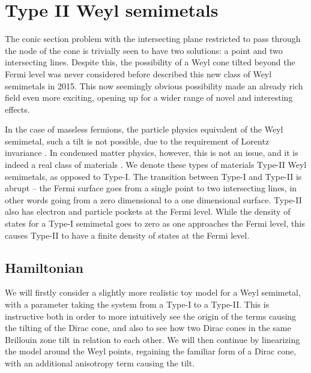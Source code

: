 \section{Type II Weyl semimetals}
\label{sec:typeii}

The conic section problem with the intersecting plane restricted to pass through the node of the cone is trivially seen to have two solutions: a point and two intersecting lines.
Despite this, the possibility of a Weyl cone tilted beyond the Fermi level was never considered before \citeauthor{soluyanovTypeIIWeylSemimetals2015} described this new class of Weyl semimetals in 2015.
This now seemingly obvious possibility made an already rich field even more exciting, opening up for a wider range of novel and interesting effects.

In the case of massless fermions, the particle physics equivalent of the Weyl semimetal, such a tilt is not possible, due to the requirement of Lorentz invariance .
In condensed matter physics, however, this is not an issue, and it is indeed a real class of materials .
We denote these types of materials Type-II Weyl semimetals, as opposed to Type-I.
The transition between Type-I and Type-II is abrupt -- the Fermi surface goes from a single point to two intersecting lines, in other words going from a zero dimensional to a one dimensional surface.
Type-II also has electron and particle pockets at the Fermi level.
While the density of states for a Type-I semimetal goes to zero as one approaches the Fermi level, this causes Type-II to have a finite density of states at the Fermi level.

\subsection{Hamiltonian}
We will firstly consider a slightly more realistic toy model for a Weyl semimetal, with a parameter taking the system from a Type-I to a Type-II.
This is instructive both in order to more intuitively see the origin of the terms causing the tilting of the Dirac cone, and also to see how two Dirac cones in the same Brillouin zone tilt in relation to each other.
We will then continue by linearizing the model around the Weyl points, regaining the familiar form of a Dirac cone, with an additional anisotropy term causing the tilt.

